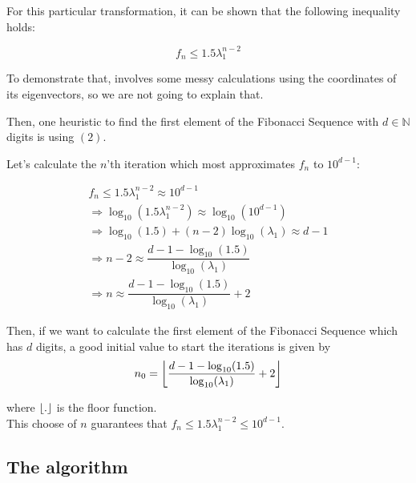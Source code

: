 \documentclass{article}
\DeclarePairedDelimiter\floor{\lfloor}{\rfloor}
\begin{document}
\newpage
For this particular transformation, it can be shown that the following 
inequality holds:

\begin{equation}
    f_n \leq 1.5 \lambda_1 ^{n - 2}
\end{equation}

To demonstrate that, involves some messy calculations using the coordinates of
its eigenvectors, so we are not going to explain that.

Then, one heuristic to find the first element of the Fibonacci Sequence with
$d \in \mathbb{N}$ digits is using $(2)$.

Let's calculate the $n$'th iteration which most approximates $f_n$ to $10^{d - 1}$:

\begin{equation*}
    \begin{aligned}
        f_n \leq 1.5\lambda_1 ^{n - 2} \approx 10^{d-1}\\
        \Rightarrow \log_{10}(1.5\lambda_1 ^{n - 2}) \approx
                                            \log_{10}(10^{d-1})\\
        \Rightarrow \log_{10}(1.5) + (n - 2) \log_{10}(\lambda_1)
                                    \approx d - 1\\
        \Rightarrow n - 2 \approx \dfrac{d - 1 - \log_{10}(1.5)}{\log_{10}(\lambda_1)}\\
        \Rightarrow n  \approx {\dfrac{d - 1 - \log_{10}(1.5)}{\log_{10}(\lambda_1)} + 2}
    \end{aligned}
\end{equation*}

Then, if we want to calculate the first element of the Fibonacci Sequence which
has $d$ digits, a good initial value to start the iterations is
given by
\begin{equation*}
    n_0 = \floor*{\dfrac{d  - 1- \log_{10}(1.5)}{\log_{10}(\lambda_1)} + 2}
\end{equation*}

where $\floor{.}$ is the floor function.\\

This choose of $n$ guarantees that
$f_n \leq 1.5\lambda_1 ^{n - 2} \leq 10^{d - 1}$.\\

\newpage
\subsection*{The algorithm}
\end{document}
